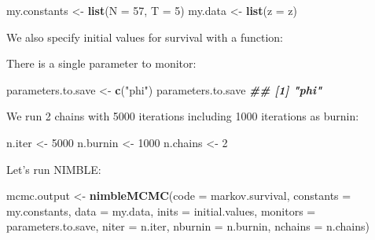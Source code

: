 \documentclass[
  12pt,
]{krantz}
\newenvironment{Shaded}{\begin{snugshade}}{\end{snugshade}}
\newcommand{\AttributeTok}[1]{\textcolor[rgb]{0.13,0.29,0.53}{#1}}
\newcommand{\ControlFlowTok}[1]{\textcolor[rgb]{0.13,0.29,0.53}{\textbf{#1}}}
\newcommand{\DecValTok}[1]{\textcolor[rgb]{0.00,0.00,0.81}{#1}}
\newcommand{\DocumentationTok}[1]{\textcolor[rgb]{0.56,0.35,0.01}{\textbf{\textit{#1}}}}
\newcommand{\FunctionTok}[1]{\textcolor[rgb]{0.13,0.29,0.53}{\textbf{#1}}}
\newcommand{\NormalTok}[1]{#1}
\newcommand{\OtherTok}[1]{\textcolor[rgb]{0.56,0.35,0.01}{#1}}
\newcommand{\StringTok}[1]{\textcolor[rgb]{0.31,0.60,0.02}{#1}}
\begin{document}
\begin{Shaded}
\begin{Highlighting}[]
\NormalTok{my.constants }\OtherTok{\textless{}{-}} \FunctionTok{list}\NormalTok{(}\AttributeTok{N =} \DecValTok{57}\NormalTok{, }\AttributeTok{T =} \DecValTok{5}\NormalTok{)}
\NormalTok{my.data }\OtherTok{\textless{}{-}} \FunctionTok{list}\NormalTok{(}\AttributeTok{z =}\NormalTok{ z)}
\end{Highlighting}
\end{Shaded}

We also specify initial values for survival with a function:

\begin{Shaded}
\end{Shaded}

There is a single parameter to monitor:

\begin{Shaded}
\begin{Highlighting}[]
\NormalTok{parameters.to.save }\OtherTok{\textless{}{-}} \FunctionTok{c}\NormalTok{(}\StringTok{"phi"}\NormalTok{)}
\NormalTok{parameters.to.save}
\DocumentationTok{\#\# [1] "phi"}
\end{Highlighting}
\end{Shaded}

We run 2 chains with 5000 iterations including 1000 iterations as burnin:

\begin{Shaded}
\begin{Highlighting}[]
\NormalTok{n.iter }\OtherTok{\textless{}{-}} \DecValTok{5000}
\NormalTok{n.burnin }\OtherTok{\textless{}{-}} \DecValTok{1000}
\NormalTok{n.chains }\OtherTok{\textless{}{-}} \DecValTok{2}
\end{Highlighting}
\end{Shaded}

Let's run NIMBLE:

\begin{Shaded}
\begin{Highlighting}[]
\NormalTok{mcmc.output }\OtherTok{\textless{}{-}} \FunctionTok{nimbleMCMC}\NormalTok{(}\AttributeTok{code =}\NormalTok{ markov.survival,}
                          \AttributeTok{constants =}\NormalTok{ my.constants,}
                          \AttributeTok{data =}\NormalTok{ my.data,}
                          \AttributeTok{inits =}\NormalTok{ initial.values,}
                          \AttributeTok{monitors =}\NormalTok{ parameters.to.save,}
                          \AttributeTok{niter =}\NormalTok{ n.iter,}
                          \AttributeTok{nburnin =}\NormalTok{ n.burnin,}
                          \AttributeTok{nchains =}\NormalTok{ n.chains)}
\end{Highlighting}
\end{Shaded}
\end{document}
